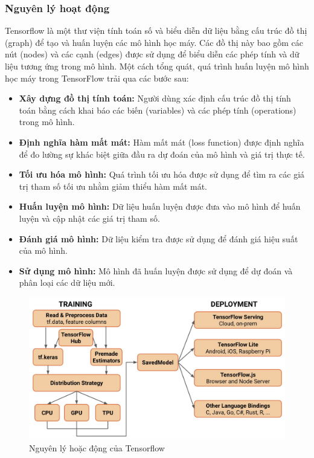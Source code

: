 \subsubsection{Nguyên lý hoạt động}
\indent Tensorflow là một thư viện tính toán số và biểu diễn dữ liệu bằng cấu trúc đồ thị (graph) để tạo và huấn luyện các mô hình học máy. Các đồ thị này bao gồm các nút (nodes) và các cạnh (edges) được sử dụng để biểu diễn các phép tính và dữ liệu tương ứng trong mô hình. Một cách tổng quát, quá trình huấn luyện mô hình học máy trong TensorFlow trải qua các bước sau:

\begin{itemize}
    \item \textbf{Xây dựng đồ thị tính toán:} Người dùng xác định cấu trúc đồ thị tính toán bằng cách khai báo các biến (variables) và các phép tính (operations) trong mô hình.
    \item \textbf{Định nghĩa hàm mất mát:} Hàm mất mát (loss function) được định nghĩa để đo lường sự khác biệt giữa đầu ra dự đoán của mô hình và giá trị thực tế.
    \item \textbf{Tối ưu hóa mô hình:} Quá trình tối ưu hóa được sử dụng để tìm ra các giá trị tham số tối ưu nhằm giảm thiểu hàm mất mát.
    \item \textbf{Huấn luyện mô hình:} Dữ liệu huấn luyện được đưa vào mô hình để huấn luyện và cập nhật các giá trị tham số.
    \item \textbf{Đánh giá mô hình:} Dữ liệu kiểm tra được sử dụng để đánh giá hiệu suất của mô hình.
    \item \textbf{Sử dụng mô hình:} Mô hình đã huấn luyện được sử dụng để dự đoán và phân loại các dữ liệu mới.
\end{itemize}
\begin{figure}[H]
    \centering
    \includegraphics[width=\textwidth,height=\textheight,keepaspectratio]{Images/Theoretical basis/nguyen-li-hoat-dong-tensorflow.jpeg}
    \caption{Nguyên lý hoặc động của Tensorflow}
    \label{fig:enter-label}
\end{figure}


